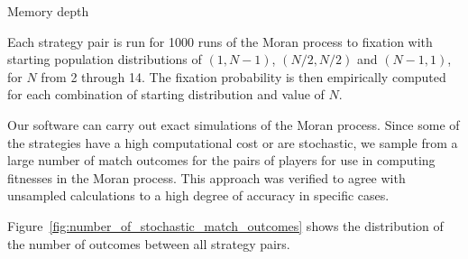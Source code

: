 \documentclass{article}
\begin{document}
\begin{table}[!hbtp]
    \centering
        
        \caption{Memory depth}
        \label{tbl:memory_depth_count}
\end{table}

Each strategy pair is run for 1000 runs of the Moran process to fixation
with starting population distributions of $(1, N-1)$,
$(N/2, N/2)$ and $(N-1 , 1)$, for \(N\) from 2 through 14. The
fixation probability is then empirically computed for each combination of
starting distribution and value of \(N\).

Our software can carry out exact simulations of the Moran process. Since some of
the strategies have a high computational cost or are stochastic, we sample from
a large number of match outcomes for the pairs of players for use in computing
fitnesses in the Moran process. This approach was verified to agree with
unsampled calculations to a high degree of accuracy in specific cases.

Figure~\ref{fig:number_of_stochastic_match_outcomes} shows the distribution of
the number of outcomes between all strategy pairs.
\end{document}
